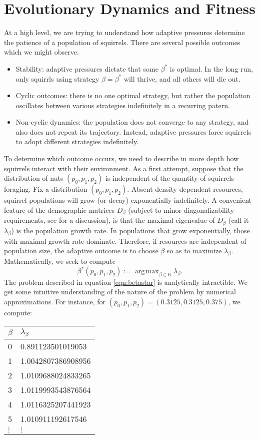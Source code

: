 \documentclass[titlepage, hidelinks, 12pt]{article}
\theoremstyle{plain}
\theoremstyle{remark}
\theoremstyle{definition}
\newcommand{\N}{\mathbb{N}}
\DeclareMathOperator*{\argmax}{arg\,max}
\begin{document}
\section{Evolutionary Dynamics and Fitness}
At a high level, we are trying to understand how adaptive pressures determine the patience of a population of squirrels. There are several
possible outcomes which we might observe.
\begin{itemize}
    \item Stability: adaptive pressures dictate that some $\beta^*$ is optimal. In the long run, only squirrls using strategy $\beta = \beta^*$ will
        thrive, and all others will die out.
    \item Cyclic outcomes: there is no one optimal strategy, but rather the population oscillates between various strategies indefinitely
        in a recurring patern.
    \item Non-cyclic dynamics: the population does not converge to any strategy, and also does not repeat its trajectory. Instead, adaptive
        pressures force squirrels to adopt different strategies indefinitely. 
\end{itemize}
To determine which outcome occurs, we need to describe in more depth how squirrels interact with their environment. As a first attempt,
suppose that the distribution of nuts $(p_0, p_1, p_2)$ is independent of the quantity of squirrels foraging. Fix a distribution
$(p_0, p_1, p_2)$. Absent density dependent
resources, squirrel populations will grow (or decay) exponentially indefinitely. A convenient feature of the demographic matrices $D_\beta$ (subject
to minor diagonalizability requirements, see \cite{stearns92} for a discussion),
is that the maximal eigenvalue of $D_\beta$ (call it $\lambda_\beta$) is the population growth rate. In populations that grow exponentially,
those with maximal growth rate dominate. Therefore, if resources are independent of population size, the adaptive outcome is to choose
$\beta$ so as to maximize $\lambda_\beta$. Mathematically, we seek to compute 
\begin{equation}
    \beta^*(p_0, p_1, p_2) := \argmax_{\beta\in\N} \lambda_\beta.
    \label{eqn:betastar}
\end{equation}
The problem described in equation \ref{eqn:betastar} is analytically intractible. We get some intuitive understanding of the nature of the problem
by numerical approximations. For instance, for $(p_0, p_1, p_2) = (0.3125, 0.3125, 0.375)$, we compute:
\begin{table}[H]
    \centering
\begin{tabular}{l|l}
$\beta$ & $\lambda_\beta$    \\ \hline
0       & 0.891123501019053  \\
1       & 1.0042807386908956 \\
2       & 1.0109688024833265 \\
3       & 1.0119993543876564 \\
4       & 1.0116325207441923 \\
5       & 1.010911192617546  \\
$\vdots$ & $\vdots$
\end{tabular}
\end{table}
\end{document}
